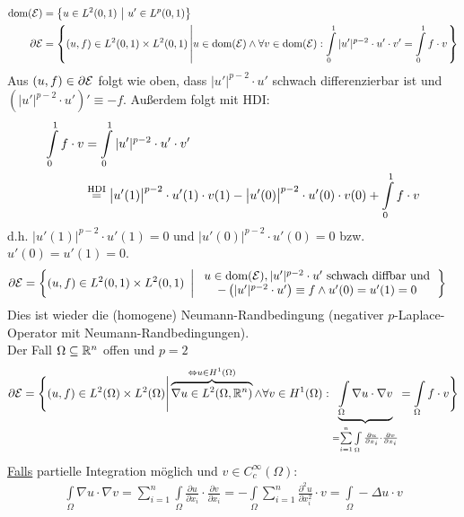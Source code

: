 \begin{beispiel}
\begin{align*}
\text{dom}(\mathcal{E})&=\big\lbrace u\in L^2(0,1)~\big|~u'\in L^p(0,1)\big\rbrace\\
\partial\mathcal{E}&=\left\lbrace(u,f)\in L^2(0,1)\times L^2(0,1)\left|u\in\text{dom}(\mathcal{E})\wedge\forall v\in\text{dom}(\mathcal{E}):\int\limits_0^1|u'|^{p-2}\cdot u'\cdot v'=\int\limits_0^1 f\cdot v\right.\right\rbrace
\end{align*}
Aus $(u,f)\in\partial\mathcal{E}$ folgt wie oben, dass $|u'|^{p-2}\cdot u'$ schwach differenzierbar ist und\\ $\left(|u'|^{p-2}\cdot u'\right)'\equiv -f$. Außerdem folgt mit HDI:
\begin{align*}
\int\limits_0^1 f\cdot v
&=\int\limits_0^1|u'|^{p-2}\cdot u'\cdot v'\\
&\stackrel{\text{HDI}}{=}
\big| u'(1)\big|^{p-2}\cdot u'(1)\cdot v(1)-
\big| u'(0)\big|^{p-2}\cdot u'(0)\cdot v(0)+\int\limits_0^1 f\cdot v
\end{align*}
d.h. $\big|u'(1)\big|^{p-2}\cdot u'(1)=0$ und $\big|u'(0)\big|^{p-2}\cdot u'(0)=0$ bzw. $u'(0)=u'(1)=0$.
\begin{align*}
\partial\mathcal{E}&=\left\lbrace(u,f)\in L^2(0,1)\times L^2(0,1)~\left|~
\begin{array}{c}
u\in\text{dom}(\mathcal{E}),|u'|^{p-2}\cdot u'\text{ schwach diffbar und}\\-\left(|u'|^{p-2}\cdot u'\right)\equiv f\wedge u'(0)=u'(1)=0
\end{array}
\right.\right\rbrace
\end{align*}
Dies ist wieder die (homogene) Neumann-Randbedingung (negativer $p$-Laplace-Operator mit Neumann-Randbedingungen).\\
Der Fall $\Omega\subseteq\mathbb{R}^n$ offen und $p=2$
\begin{align*}
\partial\mathcal{E}=\Bigg\lbrace(u,f)\in L^2(\Omega)\times L^2(\Omega)\Bigg|\overbrace{\nabla u\in L^2(\Omega,\mathbb{R}^n)}^{\Leftrightarrow u\in H^1(\Omega)}\wedge\forall v\in H^1(\Omega):\underbrace{\int\limits_\Omega\nabla u\cdot \nabla v}_{=\sum\limits_{i=1}^n\int\limits_\Omega\frac{\partial u}{\partial x_i}\cdot\frac{\partial v}{\partial x_i}}=\int\limits_\Omega f\cdot v\Bigg\rbrace
\end{align*}
\underline{Falls} partielle Integration möglich und $v\in C^\infty_c(\Omega)$:
\begin{align*}
\int\limits_\Omega\nabla u\cdot \nabla v=\sum\limits_{i=1}^n\int\limits_\Omega\frac{\partial u}{\partial x_i}\cdot\frac{\partial v}{\partial x_i}=-\int\limits_\Omega\sum\limits_{i=1}^n\frac{\partial^2 u}{\partial x_i^2}\cdot v
=\int\limits_\Omega-\Delta u\cdot v
\end{align*}


\end{beispiel}
